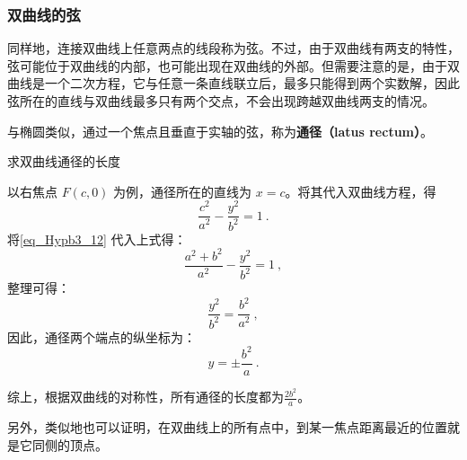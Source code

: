 \subsubsection{双曲线的弦}

同样地，连接双曲线上任意两点的线段称为弦。不过，由于双曲线有两支的特性，弦可能位于双曲线的内部，也可能出现在双曲线的外部。但需要注意的是，由于双曲线是一个二次方程，它与任意一条直线联立后，最多只能得到两个实数解，因此弦所在的直线与双曲线最多只有两个交点，不会出现跨越双曲线两支的情况。

与椭圆类似，通过一个焦点且垂直于实轴的弦，称为\textbf{通径（latus rectum）}。

\begin{example}{求双曲线通径的长度}

以右焦点 $F(c,0)$ 为例，通径所在的直线为 $x=c$。将其代入双曲线方程，得\begin{equation}
\frac{c^2}{a^2} - \frac{y^2}{b^2} = 1~.
\end{equation}
将\autoref{eq_Hypb3_12} 代入上式得：
\begin{equation}
\frac{a^2 + b^2}{a^2} - \frac{y^2}{b^2} = 1~,
\end{equation}
整理可得：
\begin{equation}
\frac{y^2}{b^2} = \frac{b^2}{a^2}~,
\end{equation}
因此，通径两个端点的纵坐标为：
\begin{equation}
y = \pm \frac{b^2}{a}~.
\end{equation}

综上，根据双曲线的对称性，所有通径的长度都为$\displaystyle\frac{2b^2}{a}$。
\end{example}

另外，类似地也可以证明，在双曲线上的所有点中，到某一焦点距离最近的位置就是它同侧的顶点。

